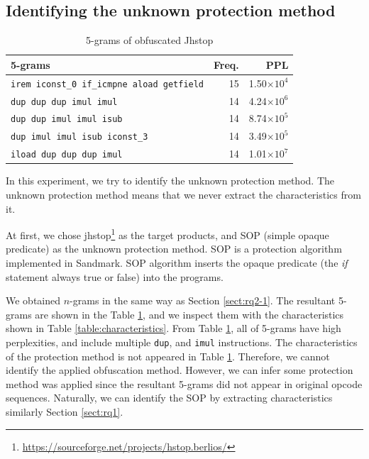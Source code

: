 \documentclass[conference]{IEEEtran}
\begin{document}
\subsection{Identifying the unknown protection method}

\begin{table}[t]
  \centering
  \footnotesize{
    \caption{5-grams of obfuscated Jhstop}\label{table:jhstop}
  \begin{tabular}{l|r|r}
    \textbf{5-grams} & \textbf{Freq.} & \textbf{PPL}\\ \hline
    \texttt{irem iconst\_0 if\_icmpne aload getfield} & 15 & 1.50$\times10^4$ \\
    \texttt{dup dup dup imul imul}                    & 14 & 4.24$\times10^6$ \\
    \texttt{dup dup imul imul isub}                   & 14 & 8.74$\times10^5$ \\
    \texttt{dup imul imul isub iconst\_3}             & 14 & 3.49$\times10^5$ \\
    \texttt{iload dup dup dup imul}                   & 14 & 1.01$\times10^7$ \\
    \end{tabular}}
\end{table}

In this experiment, we try to identify the unknown protection method.
The unknown protection method means that we never extract the
characteristics from it.

At first, we chose
jhstop\footnote[6]{\url{https://sourceforge.net/projects/hstop.berlios/}}
as the target products, and SOP (simple opaque predicate) as the
unknown protection method.  SOP is a protection algorithm implemented
in Sandmark.  SOP algorithm inserts the opaque predicate (the
\emph{if} statement always true or false) into the programs.

We obtained $n$-grams in the same way as Section \ref{sect:rq2-1}. The
resultant 5-grams are shown in the Table \ref{table:jhstop}, and we
inspect them with the characteristics shown in Table
\ref{table:characteristics}.  From Table \ref{table:jhstop}, all of
5-grams have high perplexities, and include multiple \texttt{dup}, and
\texttt{imul} instructions.  The characteristics of the protection
method is not appeared in Table \ref{table:jhstop}.  Therefore, we
cannot identify the applied obfuscation method.
%
However, we can infer some protection method was applied since the
resultant 5-grams did not appear in original opcode sequences.
%
Naturally, we can identify the SOP by extracting characteristics
similarly Section \ref{sect:rq1}.
\end{document}
